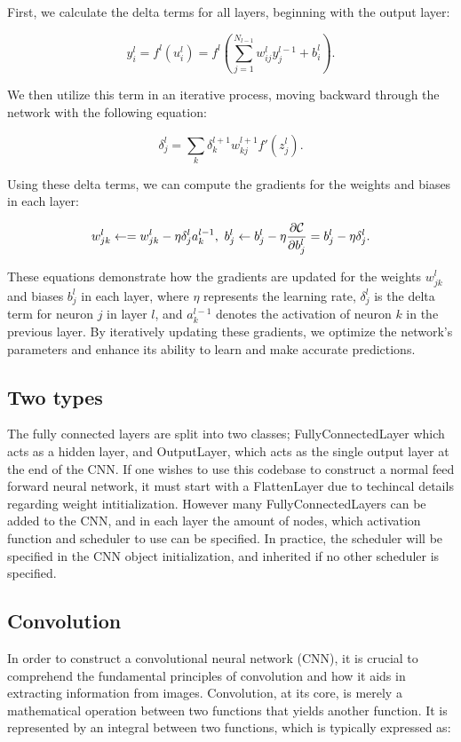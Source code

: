 \documentclass[onecolumn,10pt,cleanfoot]{asme2ej}
\begin{document}
First, we calculate the delta terms for all layers, beginning with the output layer:

\begin{equation}
y_i^l = f^l(u_i^l) = f^l\left(\sum_{j=1}^{N_{l-1}} w_{ij}^l y_j^{l-1} + b_i^l\right).
\end{equation}

We then utilize this term in an iterative process, moving backward through the network with the following equation:

\begin{equation}
\delta_j^l = \sum_k \delta_k^{l+1}w_{kj}^{l+1}f'(z_j^l).
\end{equation}

Using these delta terms, we can compute the gradients for the weights and biases in each layer:

\begin{gather}
w_{jk}^l\leftarrow = w_{jk}^l- \eta \delta_j^la_k^{l-1}, \
b_j^l \leftarrow b_j^l-\eta \frac{\partial {\cal C}}{\partial b_j^l}=b_j^l-\eta \delta_j^l.
\end{gather}

These equations demonstrate how the gradients are updated for the weights $w_{jk}^l$ and biases $b_j^l$ in each layer, where $\eta$ represents the learning rate, $\delta_j^l$ is the delta term for neuron $j$ in layer $l$, and $a_k^{l-1}$ denotes the activation of neuron $k$ in the previous layer. By iteratively updating these gradients, we optimize the network's parameters and enhance its ability to learn and make accurate predictions. 

\subsection{Two types}
The fully connected layers are split into two classes; FullyConnectedLayer which acts as a hidden layer, and OutputLayer, which acts as the single output layer at the end of the CNN. If one wishes to use this codebase to construct a normal feed forward neural network, it must start with a FlattenLayer due to techincal details regarding weight intitialization. However many FullyConnectedLayers can be added to the CNN, and in each layer the amount of nodes, which activation function and scheduler to use can be specified. In practice, the scheduler will be specified in the CNN object initialization, and inherited if no other scheduler is specified.

\subsection{Convolution}
In order to construct a convolutional neural network (CNN), it is crucial to comprehend the fundamental principles of convolution and how it aids in extracting information from images. Convolution, at its core, is merely a mathematical operation between two functions that yields another function. It is represented by an integral between two functions, which is typically expressed as:
\end{document}
